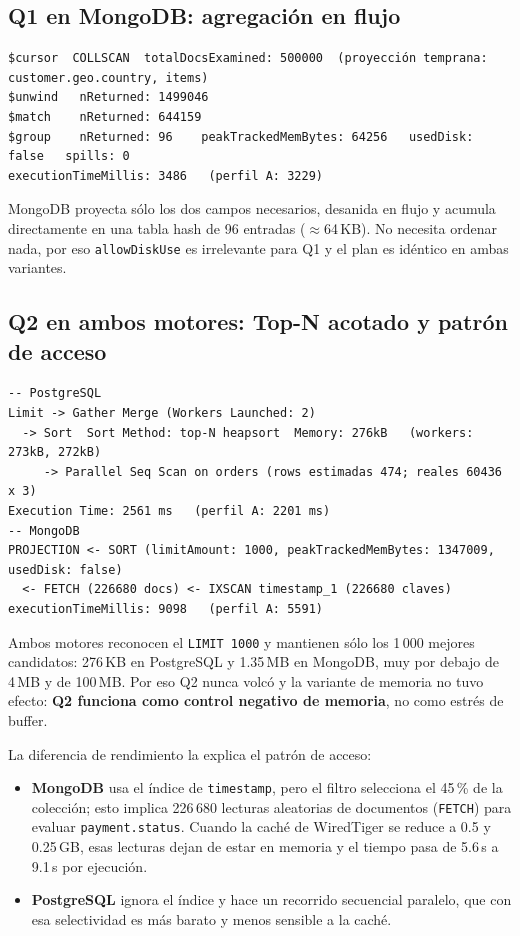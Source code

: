 \documentclass[11pt,a4paper]{article}
\begin{document}
\subsection{Q1 en MongoDB: agregación en flujo}

\begin{lstlisting}
$cursor  COLLSCAN  totalDocsExamined: 500000  (proyección temprana: customer.geo.country, items)
$unwind   nReturned: 1499046
$match    nReturned: 644159
$group    nReturned: 96    peakTrackedMemBytes: 64256   usedDisk: false   spills: 0
executionTimeMillis: 3486   (perfil A: 3229)
\end{lstlisting}

MongoDB proyecta sólo los dos campos necesarios, desanida en flujo y acumula directamente en una tabla hash de 96 entradas ($\approx$64\,KB). No necesita ordenar nada, por eso \texttt{allowDiskUse} es irrelevante para Q1 y el plan es idéntico en ambas variantes.

\subsection{Q2 en ambos motores: Top-N acotado y patrón de acceso}

\begin{lstlisting}
-- PostgreSQL
Limit -> Gather Merge (Workers Launched: 2)
  -> Sort  Sort Method: top-N heapsort  Memory: 276kB   (workers: 273kB, 272kB)
     -> Parallel Seq Scan on orders (rows estimadas 474; reales 60436 x 3)
Execution Time: 2561 ms   (perfil A: 2201 ms)
-- MongoDB
PROJECTION <- SORT (limitAmount: 1000, peakTrackedMemBytes: 1347009, usedDisk: false)
  <- FETCH (226680 docs) <- IXSCAN timestamp_1 (226680 claves)
executionTimeMillis: 9098   (perfil A: 5591)
\end{lstlisting}

Ambos motores reconocen el \texttt{LIMIT 1000} y mantienen sólo los 1\,000 mejores candidatos: 276\,KB en PostgreSQL y 1.35\,MB en MongoDB, muy por debajo de 4\,MB y de 100\,MB. Por eso Q2 nunca volcó y la variante de memoria no tuvo efecto: \textbf{Q2 funciona como control negativo de memoria}, no como estrés de buffer.

La diferencia de rendimiento la explica el patrón de acceso:
\begin{itemize}
  \item \textbf{MongoDB} usa el índice de \texttt{timestamp}, pero el filtro selecciona el 45\,\% de la colección; esto implica 226\,680 lecturas aleatorias de documentos (\texttt{FETCH}) para evaluar \texttt{payment.status}. Cuando la caché de WiredTiger se reduce a 0.5 y 0.25\,GB, esas lecturas dejan de estar en memoria y el tiempo pasa de 5.6\,s a 9.1\,s por ejecución.
  \item \textbf{PostgreSQL} ignora el índice y hace un recorrido secuencial paralelo, que con esa selectividad es más barato y menos sensible a la caché.
\end{itemize}
\end{document}
